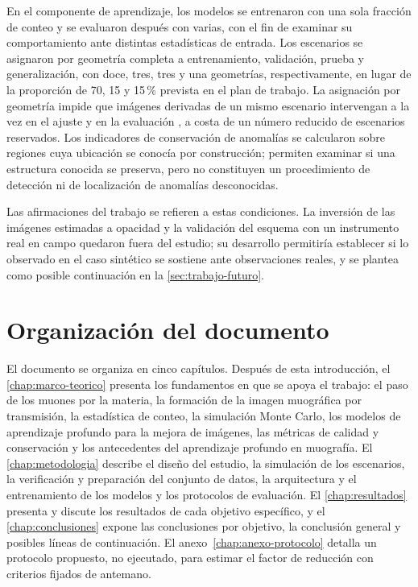 En el componente de aprendizaje, los modelos se entrenaron con una sola fracción de conteo y se evaluaron después con varias, con el fin de examinar su comportamiento ante distintas estadísticas de entrada. Los escenarios se asignaron por geometría completa a entrenamiento, validación, prueba y generalización, con doce, tres, tres y una geometrías, respectivamente, en lugar de la proporción de 70, 15 y 15\,\% prevista en el plan de trabajo. La asignación por geometría impide que imágenes derivadas de un mismo escenario intervengan a la vez en el ajuste y en la evaluación \parencite{kaufman2012}, a costa de un número reducido de escenarios reservados. Los indicadores de conservación de anomalías se calcularon sobre regiones cuya ubicación se conocía por construcción; permiten examinar si una estructura conocida se preserva, pero no constituyen un procedimiento de detección ni de localización de anomalías desconocidas.

Las afirmaciones del trabajo se refieren a estas condiciones. La inversión de las imágenes estimadas a opacidad y la validación del esquema con un instrumento real en campo quedaron fuera del estudio; su desarrollo permitiría establecer si lo observado en el caso sintético se sostiene ante observaciones reales, y se plantea como posible continuación en la \cref{sec:trabajo-futuro}.

\section{Organización del documento}
\label{sec:intro-organizacion}

El documento se organiza en cinco capítulos. Después de esta introducción, el \cref{chap:marco-teorico} presenta los fundamentos en que se apoya el trabajo: el paso de los muones por la materia, la formación de la imagen muográfica por transmisión, la estadística de conteo, la simulación Monte Carlo, los modelos de aprendizaje profundo para la mejora de imágenes, las métricas de calidad y conservación y los antecedentes del aprendizaje profundo en muografía. El \cref{chap:metodologia} describe el diseño del estudio, la simulación de los escenarios, la verificación y preparación del conjunto de datos, la arquitectura y el entrenamiento de los modelos y los protocolos de evaluación. El \cref{chap:resultados} presenta y discute los resultados de cada objetivo específico, y el \cref{chap:conclusiones} expone las conclusiones por objetivo, la conclusión general y posibles líneas de continuación. El anexo~\ref{chap:anexo-protocolo} detalla un protocolo propuesto, no ejecutado, para estimar el factor de reducción con criterios fijados de antemano.

